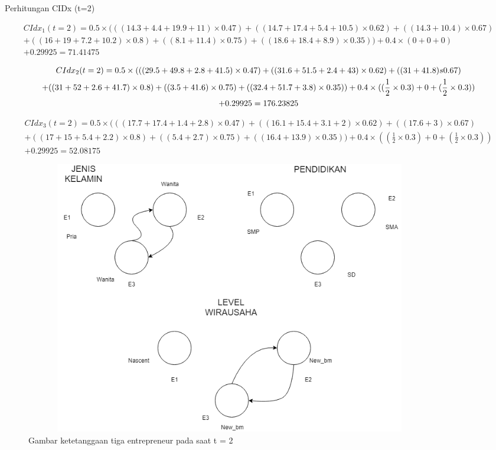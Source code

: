 Perhitungan CIDx (t=2)


\begin{multline}
	CIdx_{1}(t=2) = 0.5 \times (((14.3+4.4+19.9+11) \times 0.47) + ((14.7+17.4+5.4+10.5) \times 0.62) + ((14.3+10.4) \times 0.67)\\ + ((16+19+7.2+10.2) \times 0.8) + ((8.1+11.4) \times 0.75) + ((18.6+18.4+8.9) \times 0.35) ) + 0.4 \times (0 + 0 + 0)\\ + 0.29925 = 71.41475
\end{multline}

\begin{multline}
	CIdx_{2}(t=2) = 0.5 \times (((29.5+49.8+2.8+41.5) \times 0.47) + ((31.6+51.5+2.4+43) \times 0.62) + ((31+41.8) \time2s 0.67)\\+ ((31+52+2.6+41.7) \times 0.8) + ((3.5+41.6) \times 0.75) + ((32.4+51.7 + 3.8) \times 0.35)) + 0.4 \times ((\frac {1} {2} \times 0.3) + 0 +  (\frac {1} {2} \times 0.3))\\ + 0.29925 = 176.23825
\end{multline}

\begin{multline}
	CIdx_{3}(t=2) = 0.5 \times (((17.7+17.4+1.4+2.8) \times 0.47) + ((16.1+15.4+3.1+2) \times 0.62) + ((17.6+3) \times 0.67)\\+ ((17+15+5.4+2.2) \times 0.8) + ((5.4+2.7) \times 0.75) + ((16.4+13.9) \times 0.35)) + 0.4 \times ((\frac {1} {2} \times 0.3) + 0 +  (\frac {1} {2} \times 0.3))\\ + 0.29925 = 52.08175
\end{multline}

	\begin{figure} [H]
		\centering  
		\includegraphics[width=18cm, height=12cm]{t=0} 
		\caption[Gambar ketetanggaan tiga entrepreneur pada saat t = 2]{Gambar ketetanggaan tiga entrepreneur pada saat t = 2} 
		\label{fig:t2} 
	\end{figure}
	
